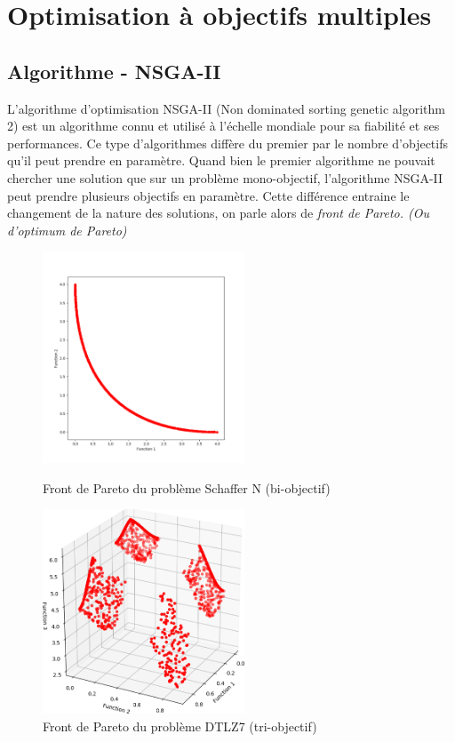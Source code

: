 \documentclass[12pt]{report}
\begin{document}
  \chapter{Optimisation à objectifs multiples}
    \section{Algorithme - NSGA-II}
    L'algorithme d'optimisation NSGA-II (Non dominated sorting genetic algorithm 2) est un algorithme connu et utilisé à l'échelle mondiale pour sa fiabilité et ses performances. Ce type d'algorithmes diffère du premier par le nombre d'objectifs qu'il peut prendre en paramètre. Quand bien le premier algorithme ne pouvait chercher une solution que sur un problème mono-objectif, l'algorithme NSGA-II peut prendre plusieurs objectifs en paramètre. Cette différence entraine le changement de la nature des solutions, on parle alors de \emph{front de Pareto. (Ou d'optimum de Pareto)}\\

    \begin{figure}[h]
      \begin{minipage}[c]{.46\linewidth}
          \centering
          \includegraphics[width=6cm]{img/4,1,1_Pareto_uni.png}
          \caption{Front de Pareto du problème Schaffer N \cite{wiki5} (bi-objectif)}
          \label{sch}
      \end{minipage}
      \hfill%
      \begin{minipage}[c]{.46\linewidth}
          \centering
          \includegraphics[width=6cm]{img/4,1,1_Pareto.png}
          \caption{Front de Pareto du problème DTLZ7 (tri-objectif)}
      \end{minipage}
    \end{figure}
\end{document}
